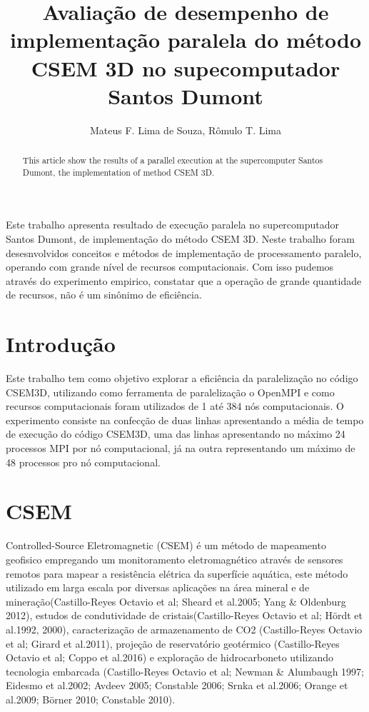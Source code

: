 \documentclass[12pt]{article}
\title{Avaliação de desempenho de implementação paralela do método CSEM 3D no supecomputador Santos Dumont}
\author{Mateus F. Lima de Souza\inst{1,2}, Rômulo T. Lima\inst{1,3}}
\begin{document}
 

\maketitle

\begin{abstract}
  This article show the results of a parallel execution at the supercomputer Santos Dumont, the implementation of method CSEM 3D.
\end{abstract}
     
\begin{resumo} 
  Este trabalho apresenta resultado de execução paralela no supercomputador Santos Dumont, de implementação do método CSEM 3D. Neste trabalho foram desesnvolvidos conceitos e métodos de implementação de processamento paralelo, operando com grande nível de recursos computacionais. Com isso pudemos através do experimento empirico, constatar que a operação de grande quantidade de recursos, não é um sinônimo de eficiência.
\end{resumo}

\section{Introdução}
Este trabalho tem como objetivo explorar a eficiência da paralelização no código CSEM3D, utilizando como ferramenta de paralelização o OpenMPI e como recursos computacionais foram utilizados de 1 até 384 nós computacionais. O experimento consiste na confecção de duas linhas apresentando a média de tempo de execução do código CSEM3D, uma das linhas apresentando no máximo 24 processos MPI por nó computacional, já na outra representando um máximo de 48 processos pro nó computacional.

\section{CSEM} \label{sec:firstpage}
Controlled-Source Eletromagnetic (CSEM) é um método de mapeamento geofisico empregando um monitoramento eletromagnético através de sensores remotos para mapear a resistência elétrica da superfície aquática, este método utilizado em larga escala por diversas aplicações na área mineral e de mineração(Castillo-Reyes
Octavio et al; Sheard et al.2005; Yang \& Oldenburg 2012), estudos de condutividade de cristais(Castillo-Reyes
Octavio et al; Hördt et al.1992, 2000), caracterização de armazenamento de CO2 (Castillo-Reyes
Octavio et al; Girard et al.2011), projeção de reservatório geotérmico (Castillo-Reyes
Octavio et al; Coppo et al.2016) e exploração de hidrocarboneto utilizando tecnologia embarcada (Castillo-Reyes
Octavio et al; Newman \& Alumbaugh 1997; Eidesmo et al.2002; Avdeev 2005; Constable 2006; Srnka et al.2006; Orange et al.2009; Börner 2010; Constable 2010). 
\end{document}
